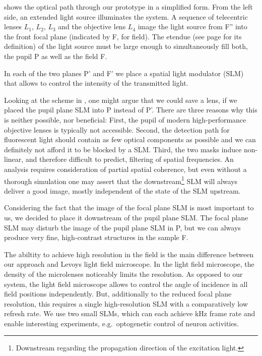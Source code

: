  shows the optical path through our prototype
in a simplified form.  From the left side, an extended light source
illuminates the system. A sequence of telecentric lenses $L_1$, $L_2$,
$L_3$ and the objective lens $L_4$ image the light source from F''
into the front focal plane (indicated by F, for field). The etendue
(see page \pageref{sec:etendue} for its definition) of the light
source must be large enough to simultaneously fill both, the pupil P
as well as the field F.

In each of the two planes P' and F' we place a spatial light modulator
(SLM) that allows to control the intensity of the transmitted light.

Looking at the scheme in , one might argue
that we could save a lens, if we placed the pupil plane SLM into P
instead of P'. There are three reasons why this is neither possible,
nor beneficial: First, the pupil of modern high-performance objective
lenses is typically not accessible. Second, the detection path for
fluorescent light should contain as few optical components as possible
and we can definitely not afford it to be blocked by a SLM.  Third,
the two masks induce non-linear, and therefore difficult to predict,
filtering of spatial frequencies. An analysis requires consideration
of partial spatial coherence, but even without a thorough simulation
one may assert that the downstream\footnote{Downstream regarding the
  propagation direction of the excitation light.} SLM will always
deliver a good image, mostly independent of the state of the SLM
upstream.

Considering the fact that the image of the focal plane SLM is most
important to us, we decided to place it downstream of the pupil plane
SLM. The focal plane SLM may disturb the image of the pupil plane SLM
in P, but we can always produce very fine, high-contrast structures in
the sample F.

The abiltity to achieve high resolution in the field is the main
difference between our approach and Levoys light field microscope.  In
the light field microscope, the density of the microlenses noticeably
limits the resolution. As opposed to our system, the light field
microscope allows to control the angle of incidence in all field
positions independently.  But, additionally to the reduced focal plane
resolution, this requires a single high-resolution SLM with a
comparatively low refresh rate. We use two small SLMs, which can each
achieve \unit[1]{kHz} frame rate and enable interesting experiments,
e.g.\ optogenetic control of neuron activities.

